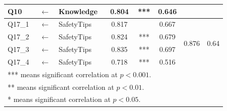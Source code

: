 \begin{table}[h]
\begin{tabular}{lcl|cc|ccc}
Q10                  & $\longleftarrow$       & Knowledge            & 0.804  & ***                  & 0.646                &                        &                        \\
\hline
Q17\_1               & $\longleftarrow$       & SafetyTips           & 0.817  &  & 0.667                & \multirow{4}{*}{0.876} & \multirow{4}{*}{0.64}  \\
Q17\_2               & $\longleftarrow$       & SafetyTips           & 0.824  & ***                  & 0.679                &                        &                        \\
Q17\_3               & $\longleftarrow$       & SafetyTips           & 0.835  & ***                  & 0.697                &                        &                        \\
Q17\_4               & $\longleftarrow$       & SafetyTips           & 0.718  & ***                  & 0.516                &                        &                       \\
  \hline
\multicolumn{5}{l}{*** means significant correlation at $p<0.001$.} \\
\multicolumn{5}{l}{** means significant correlation at $p<0.01$.} \\
\multicolumn{5}{l}{* means significant correlation at $p<0.05$.} \\
  \end{tabular}
\end{table}




